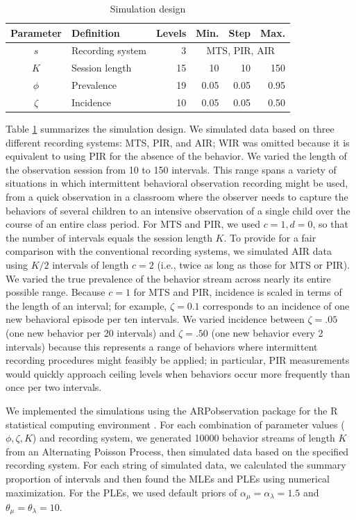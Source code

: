 \documentclass[man, noextraspace, floatsintext]{apa6}\usepackage[]{graphicx}\usepackage[]{color}
\begin{document}
\begin{table}[tb]
\centering
\caption{Simulation design}
\label{tb:simulation_design}
\begin{tabular}{clrrrr} \toprule
Parameter & Definition & Levels & Min. & Step & Max. \\ \midrule
$s$ & Recording system & 3 & \multicolumn{3}{c}{MTS, PIR, AIR} \\
$K$ & Session length & 15 & 10 & 10 & 150 \\
$\phi$ & Prevalence & 19 & 0.05 & 0.05 & 0.95 \\
$\zeta$ & Incidence & 10 & 0.05 & 0.05 & 0.50 \\
\bottomrule
\end{tabular}
\end{table}

Table \ref{tb:simulation_design} summarizes the simulation design.
We simulated data based on three different recording systems: MTS, PIR, and AIR; WIR was omitted because it is equivalent to using PIR for the absence of the behavior.
We varied the length of the observation session from 10 to 150 intervals. 
This range spans a variety of situations in which intermittent behavioral observation recording might be used, from a quick observation in a classroom where the observer needs to capture the behaviors of several children to an intensive observation of a single child over the course of an entire class period. 
For MTS and PIR, we used $c = 1, d = 0$, so that the number of intervals equals the session length $K$. 
To provide for a fair comparison with the conventional recording systems, we simulated AIR data using $K / 2$ intervals of length $c = 2$ (i.e., twice as long as those for MTS or PIR). 
We varied the true prevalence of the behavior stream across nearly its entire possible range. 
Because $c = 1$ for MTS and PIR, incidence is scaled in terms of the length of an interval; for example, $\zeta = 0.1$ corresponds to an incidence of one new behavioral episode per ten intervals.
We varied incidence  between $\zeta = .05$ (one new behavior per 20 intervals) and $\zeta = .50$ (one new behavior every 2 intervals) because this represents a range of behaviors where intermittent recording procedures might feasibly be applied; in particular, PIR measurements would quickly approach ceiling levels when behaviors occur more frequently than once per two intervals. 

We implemented the simulations using the ARPobservation package \citep{Pustejovsky2014ARPobservation} for the R statistical computing environment \citep{RCoreTeam2014}. 
For each combination of parameter values ($\phi,\zeta,K$) and recording system, we generated 10000 behavior streams of length $K$ from an Alternating Poisson Process, then simulated data based on the specified recording system. 
For each string of simulated data, we calculated the summary proportion of intervals and then found the MLEs and PLEs using numerical maximization. 
For the PLEs, we used default priors of $\alpha_\mu = \alpha_\lambda = 1.5$ and $\theta_\mu = \theta_\lambda = 10$. 
\end{document}
